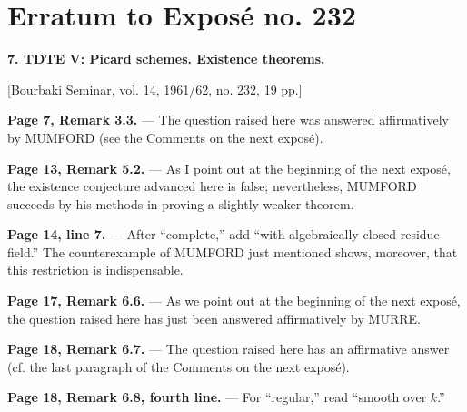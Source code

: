 \clearpage
\chapter*{Erratum to Exposé no. 232}

\noindent\textbf{7. TDTE V: Picard schemes. Existence theorems.}

\begin{center}
[Bourbaki Seminar, vol. 14, 1961/62, no. 232, 19 pp.]
\end{center}

\noindent\textbf{Page 7, Remark 3.3.} --- The question raised here was answered
affirmatively by MUMFORD (see the Comments on the next exposé).

\noindent\textbf{Page 13, Remark 5.2.} --- As I point out at the beginning of
the next exposé, the existence conjecture advanced here is false; nevertheless,
MUMFORD succeeds by his methods in proving a slightly weaker theorem.

\noindent\textbf{Page 14, line 7.} --- After “complete,” add “with
algebraically closed residue field.” The counterexample of MUMFORD just
mentioned shows, moreover, that this restriction is indispensable.

\noindent\textbf{Page 17, Remark 6.6.} --- As we point out at the beginning of
the next exposé, the question raised here has just been answered affirmatively
by MURRE.

\noindent\textbf{Page 18, Remark 6.7.} --- The question raised here has an
affirmative answer (cf. the last paragraph of the Comments on the next
exposé).

\noindent\textbf{Page 18, Remark 6.8, fourth line.} --- For “regular,” read
“smooth over $k$.”
